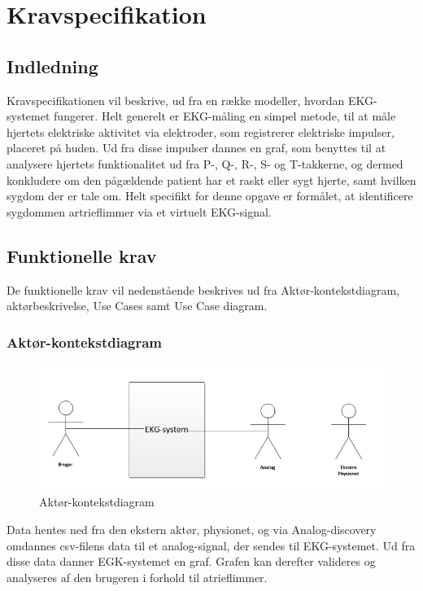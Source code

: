 \chapter{Kravspecifikation}

\section{Indledning}
Kravspecifikationen vil beskrive, ud fra en række modeller, hvordan EKG-systemet fungerer. Helt generelt er EKG-måling en simpel metode, til at måle hjertets elektriske aktivitet via elektroder, som registrerer elektriske impulser, placeret på huden. Ud fra disse impulser dannes en graf, som benyttes til at analysere hjertets funktionalitet ud fra P-, Q-, R-, S- og T-takkerne, og dermed konkludere om den pågældende patient har et raskt eller sygt hjerte, samt hvilken sygdom der er tale om. Helt specifikt for denne opgave er formålet, at identificere sygdommen artrieflimmer via et virtuelt EKG-signal. 

\section{Funktionelle krav}
De funktionelle krav vil nedenstående beskrives ud fra Aktør-kontekstdiagram, aktørbeskrivelse, Use Cases samt Use Case diagram. 

\subsection{Aktør-kontekstdiagram}

\begin{figure}[htb]
	\centering
	\includegraphics[width=1\textwidth]{Figurer/Snip20150320_4}
	\caption{Aktør-kontekstdiagram}
	\label{fig:aktoerbeskrivelse}
\end{figure}

Data hentes ned fra den ekstern aktør, physionet, og via Analog-discovery omdannes csv-filens data til et analog-signal, der sendes til EKG-systemet. Ud fra disse data danner EGK-systemet en graf. Grafen kan derefter valideres og analyseres af den brugeren i forhold til atrieflimmer. 

